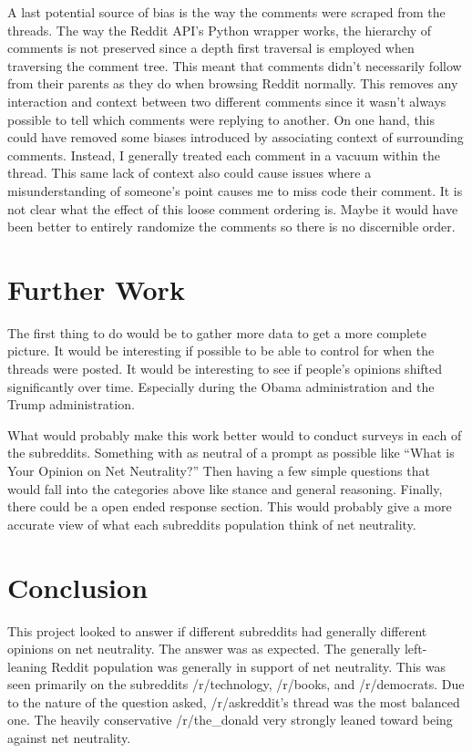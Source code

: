 \documentclass[11pt]{article}
\begin{document}
	A last potential source of bias is the way the comments were scraped from the threads. The way the Reddit API's Python wrapper works, the hierarchy of comments is not preserved since a depth first traversal is employed when traversing the comment tree. This meant that comments didn't necessarily follow from their parents as they do when browsing Reddit normally. This removes any interaction and context between two different comments since it wasn't always possible to tell which comments were replying to another. On one hand, this could have removed some biases introduced by associating context of surrounding comments. Instead, I generally treated each comment in a vacuum within the thread. This same lack of context also could cause issues where a misunderstanding of someone's point causes me to miss code their comment. It is not clear what the effect of this loose comment ordering is. Maybe it would have been better to entirely randomize the comments so there is no discernible order. 
	\section{Further Work}\label{sec:further}
	The first thing to do would be to gather more data to get a more complete picture. It would be interesting if possible to be able to control for when the threads were posted. It would be interesting to see if people's opinions shifted significantly over time. Especially during the Obama administration and the Trump administration. 
	
	What would probably make this work better would to conduct surveys in each of the subreddits. Something with as neutral of a prompt as possible like ``What is Your Opinion on Net Neutrality?'' Then having a few simple questions that would fall into the categories above like stance and general reasoning. Finally, there could be a open ended response section. This would probably give a more accurate view of what each subreddits population think of net neutrality. 
	\section{Conclusion}\label{sec:conclusion}
	This project looked to answer if different subreddits had generally different opinions on net neutrality. The answer was as expected. The generally left-leaning Reddit population was generally in support of net neutrality. This was seen primarily on the subreddits /r/technology, /r/books, and /r/democrats. Due to the nature of the question asked, /r/askreddit's thread was the most balanced one. The heavily conservative /r/the\_donald very strongly leaned toward being against net neutrality. 
	
\end{document}
